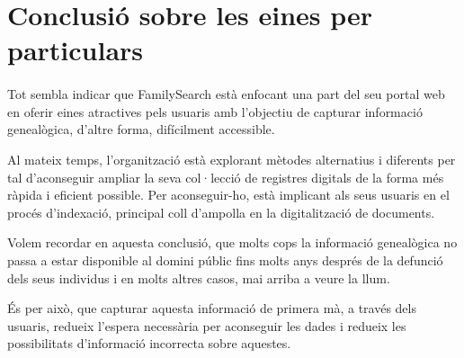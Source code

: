 \section{Conclusió sobre les eines per particulars}

    \paragraph{}
    Tot sembla indicar que  FamilySearch està enfocant una part del seu portal web en oferir eines atractives pels usuaris amb l'objectiu de capturar informació genealògica, d'altre forma, difícilment accessible.

    Al mateix temps, l’organització està explorant mètodes alternatius i diferents per tal d’aconseguir ampliar la seva col·lecció de registres digitals de la forma més ràpida i eficient possible. Per aconseguir-ho, està implicant als seus usuaris en el procés d’indexació, principal coll d'ampolla en la digitalització de documents.

    Volem recordar en aquesta conclusió, que molts cops la informació genealògica no passa a estar disponible al domini públic fins molts anys després de la defunció dels seus individus i en molts altres casos, mai arriba a veure la llum.

    És per això, que capturar aquesta informació de primera mà, a través dels usuaris, redueix l'espera necessària per aconseguir les dades i redueix les po\-ssi\-bi\-li\-tats d'informació incorrecta sobre aquestes.
